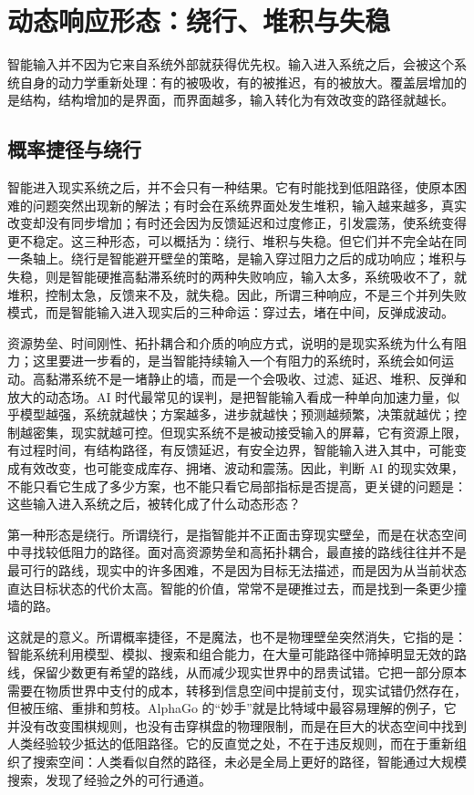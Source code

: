 \section{动态响应形态：绕行、堆积与失稳}

智能输入并不因为它来自系统外部就获得优先权。输入进入系统之后，会被这个系统自身的动力学重新处理：有的被吸收，有的被推迟，有的被放大。覆盖层增加的是结构，结构增加的是界面，而界面越多，输入转化为有效改变的路径就越长。

\subsection{概率捷径与绕行}

智能进入现实系统之后，并不会只有一种结果。它有时能找到低阻路径，使原本困难的问题突然出现新的解法；有时会在系统界面处发生堆积，输入越来越多，真实改变却没有同步增加；有时还会因为反馈延迟和过度修正，引发震荡，使系统变得更不稳定。这三种形态，可以概括为：绕行、堆积与失稳。但它们并不完全站在同一条轴上。绕行是智能避开壁垒的策略，是输入穿过阻力之后的成功响应；堆积与失稳，则是智能硬推高黏滞系统时的两种失败响应，输入太多，系统吸收不了，就堆积，控制太急，反馈来不及，就失稳。因此，所谓三种响应，不是三个并列失败模式，而是智能输入进入现实后的三种命运：穿过去，堵在中间，反弹成波动。

资源势垒、时间刚性、拓扑耦合和介质的响应方式，说明的是现实系统为什么有阻力；这里要进一步看的，是当智能持续输入一个有阻力的系统时，系统会如何运动。高黏滞系统不是一堵静止的墙，而是一个会吸收、过滤、延迟、堆积、反弹和放大的动态场。AI 时代最常见的误判，是把智能输入看成一种单向加速力量，似乎模型越强，系统就越快；方案越多，进步就越快；预测越频繁，决策就越优；控制越密集，现实就越可控。但现实系统不是被动接受输入的屏幕，它有资源上限，有过程时间，有结构路径，有反馈延迟，有安全边界，智能输入进入其中，可能变成有效改变，也可能变成库存、拥堵、波动和震荡。因此，判断 AI 的现实效果，不能只看它生成了多少方案，也不能只看它局部指标是否提高，更关键的问题是：这些输入进入系统之后，被转化成了什么动态形态？


第一种形态是绕行。所谓绕行，是指智能并不正面击穿现实壁垒，而是在状态空间中寻找较低阻力的路径。面对高资源势垒和高拓扑耦合，最直接的路线往往并不是最可行的路线，现实中的许多困难，不是因为目标无法描述，而是因为从当前状态直达目标状态的代价太高。智能的价值，常常不是硬推过去，而是找到一条更少撞墙的路。

这就是的意义。所谓概率捷径，不是魔法，也不是物理壁垒突然消失，它指的是：智能系统利用模型、模拟、搜索和组合能力，在大量可能路径中筛掉明显无效的路线，保留少数更有希望的路线，从而减少现实世界中的昂贵试错。它把一部分原本需要在物质世界中支付的成本，转移到信息空间中提前支付，现实试错仍然存在，但被压缩、重排和剪枝。AlphaGo 的“妙手”就是比特域中最容易理解的例子\cite{silver2016mastering}，它并没有改变围棋规则，也没有击穿棋盘的物理限制，而是在巨大的状态空间中找到人类经验较少抵达的低阻路径。它的反直觉之处，不在于违反规则，而在于重新组织了搜索空间：人类看似自然的路径，未必是全局上更好的路径，智能通过大规模搜索，发现了经验之外的可行通道。

